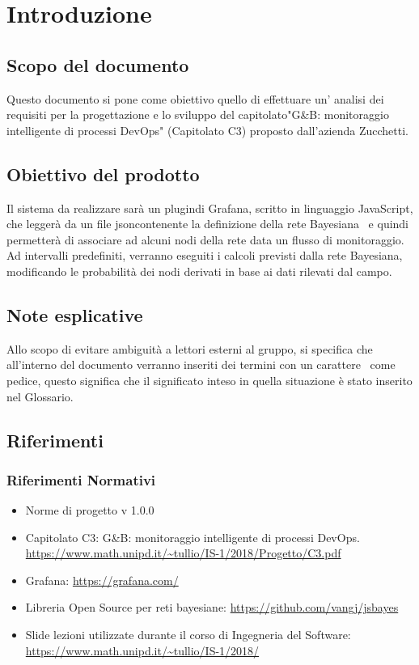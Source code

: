 \section{Introduzione}
		\subsection{Scopo del documento}			
Questo documento si pone come obiettivo quello di effettuare un' analisi dei requisiti per la progettazione e lo sviluppo del capitolato\pedice "G\&B: monitoraggio intelligente di processi DevOps\pedice" (Capitolato C3) proposto dall'azienda Zucchetti\pedice.


		\subsection{Obiettivo del prodotto}

Il sistema da realizzare sarà  un plugin\pedice di Grafana\pedice, scritto in linguaggio JavaScript\pedice, che leggerà da un file json\pedice contenente la definizione della rete Bayesiana\pedice~ e quindi permetterà di associare ad alcuni nodi della rete data un flusso di monitoraggio\pedice.
Ad intervalli predefiniti, verranno eseguiti i calcoli previsti dalla rete Bayesiana, modificando le probabilità dei nodi derivati in base ai dati rilevati dal campo.


		\subsection{Note esplicative}

Allo scopo di evitare ambiguità a lettori esterni al gruppo, si specifica che all'interno del documento verranno inseriti dei termini con un carattere\pedice~ come pedice, questo significa che il significato inteso in quella situazione è stato inserito nel Glossario.

		\subsection{Riferimenti}
		\subsubsection{Riferimenti Normativi}
		\begin{itemize}
			\item Norme di progetto v 1.0.0
			\item Capitolato C3: G\&B: monitoraggio intelligente di processi DevOps.\newline
			\url{https://www.math.unipd.it/~tullio/IS-1/2018/Progetto/C3.pdf}
			\item Grafana:\newline
			\url{https://grafana.com/}
			\item Libreria Open Source per reti bayesiane:\newline
			\url{https://github.com/vangj/jsbayes}
			\item Slide lezioni utilizzate durante il corso di Ingegneria del Software:\newline
			\url{https://www.math.unipd.it/~tullio/IS-1/2018/}
		\end{itemize}
